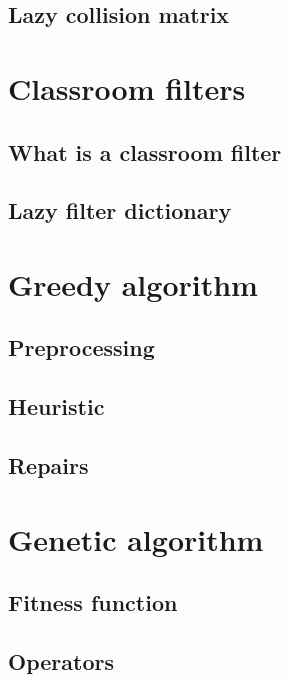 \subsection{Lazy collision matrix}



\section{Classroom filters}\label{classroom-filters}


\subsection{What is a classroom filter}

\subsection{Lazy filter dictionary}



\section{Greedy algorithm}


\subsection{Preprocessing}

\subsection{Heuristic}

\subsection{Repairs}



\section{Genetic algorithm}


\subsection{Fitness function}

\subsection{Operators}

